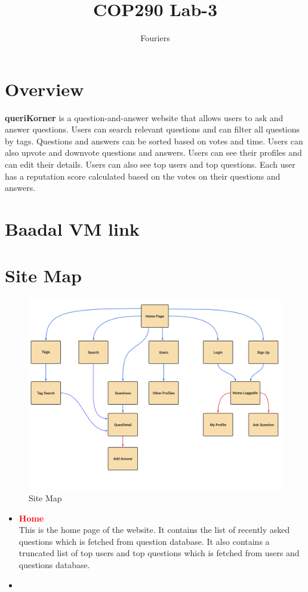 \documentclass{article}
\title{COP290 Lab-3}
\author{Fouriers}
\date{}
\begin{document}
\maketitle


\section{Overview}
\textbf{queriKorner} is a question-and-answer website that allows users to ask and answer questions.
Users can search relevant questions and can filter all questions by tags.
Questions and answers can be sorted based on votes and time.
Users can also upvote and downvote questions and answers.
Users can see their profiles and can edit their details.
Users can also see top users and top questions.
Each user has a reputation score calculated based on the votes on their questions and answers.
\section{Baadal VM link}
\section{Site Map}

\begin{figure}[h]
    \centering
    \includegraphics[width=13cm]{sitemap.png}
    \caption[short]{Site Map}
    \end{figure}

\newpage


\begin{itemize}
    \item \textcolor{red}{\textbf{Home}} \\ This is the home page of the website. It contains the list of recently asked questions which is fetched from question database. It also contains a truncated list of top users and top questions which is fetched from users and questions database.
    \item 
\end{itemize}
\end{document}
